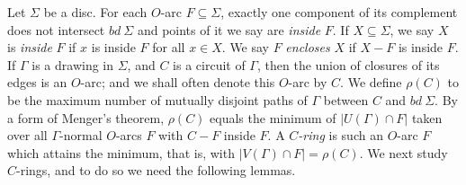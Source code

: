 Let $\Sigma$ be a disc. For each $O$-arc $F \subseteq \Sigma$, exactly one component of its complement does not intersect $bd\ \Sigma$ and points of it we say are \textit{inside} $F$. If $X \subseteq \Sigma$, we say $X$ is \textit{inside} $F$ if $x$ is inside $F$ for all $x \in X$. We say $F$ \textit{encloses} $X$ if $X - F$ is inside $F$. If $\Gamma$ is a drawing in $\Sigma$, and $C$ is a circuit of $\Gamma$, then the union of closures of its edges is an $O$-arc; and we shall often denote this $O$-arc by $C$. We define $\rho(C)$ to be the maximum number of mutually disjoint paths of $\Gamma$ between $C$ and $bd\ \Sigma$. By a form of Menger's theorem, $\rho(C)$ equals the minimum of $|U(\Gamma) \cap F|$ taken over all $\Gamma$-normal $O$-arcs $F$ with $C - F$ inside $F$. A \textit{$C$-ring} is such an $O$-arc $F$ which attains the minimum, that is, with $|V(\Gamma) \cap F| = \rho(C)$. We next study $C$-rings, and to do so we need the following lemmas.
